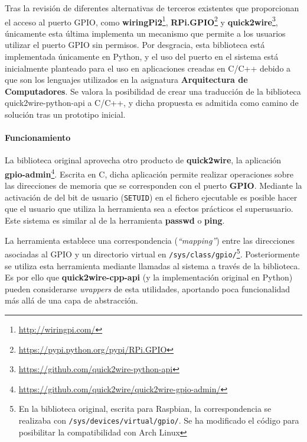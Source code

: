 Tras la revisión de diferentes alternativas de terceros existentes que proporcionan el acceso al puerto GPIO, como \textbf{wiringPi2}\footnote{\href{http://wiringpi.com/}{http://wiringpi.com/}}, \textbf{RPi.GPIO}\footnote{\href{https://pypi.python.org/pypi/RPi.GPIO}{https://pypi.python.org/pypi/RPi.GPIO}} y \textbf{quick2wire}\footnote{\href{https://github.com/quick2wire-python-api}{https://github.com/quick2wire-python-api}}, únicamente esta última implementa un mecanismo que permite a los usuarios utilizar el puerto GPIO sin permisos. Por desgracia, esta biblioteca está implementada únicamente en Python, y el uso del puerto en el sistema está inicialmente planteado para el uso en aplicaciones creadas en C/C++ debido a que son los lenguajes utilizados en la asignatura \textbf{Arquitectura de Computadores}. Se valora la posibilidad de crear una traducción de la biblioteca quick2wire-python-api a C/C++, y dicha propuesta es admitida como camino de solución tras un prototipo inicial.

\paragraph{Funcionamiento\\}

La biblioteca original aprovecha otro producto de \textbf{quick2wire}, la aplicación \textbf{gpio-admin}\footnote{\href{https://github.com/quick2wire/quick2wire-gpio-admin/}{https://github.com/quick2wire/quick2wire-gpio-admin/}}. Escrita en C, dicha aplicación permite realizar operaciones sobre las direcciones de memoria que se corresponden con el puerto \textbf{GPIO}. Mediante la activación de del bit de usuario (\texttt{SETUID}) en el fichero ejecutable es posible hacer que el usuario que utiliza la herramienta sea a efectos prácticos el superusuario. Este sistema es similar al de la herramienta \textbf{passwd} o \textbf{ping}.

La herramienta establece una correspondencia (\textit{``mapping''}) entre las direcciones asociadas al GPIO y un directorio virtual en \texttt{/sys/class/gpio/}\footnote{En la biblioteca original, escrita para Raspbian, la correspondencia se realizaba con \texttt{/sys/devices/virtual/gpio/}. Se ha modificado el código para posibilitar la compatibilidad con Arch Linux}. Posteriormente se utiliza esta herramienta mediante llamadas al sistema a través de la biblioteca. Es por ello que \textbf{quick2wire-cpp-api} (y la implementación original en Python) pueden considerarse \textit{wrappers} de esta utilidades, aportando poca funcionalidad más allá de una capa de abstracción.

